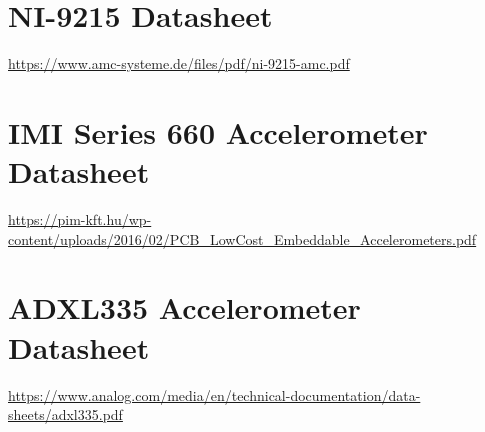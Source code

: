 \documentclass{article}
\begin{document}
\newpage
\begin{appendices}
\pagestyle{fancy}
\renewcommand{\thefigure}{A\arabic{figure}}
\setcounter{figure}{0}


\newpage

\section*{NI-9215 Datasheet}
\url{https://www.amc-systeme.de/files/pdf/ni-9215-amc.pdf}

\section*{IMI Series 660 Accelerometer Datasheet}
\url{https://pim-kft.hu/wp-content/uploads/2016/02/PCB_LowCost_Embeddable_Accelerometers.pdf}

\section*{ADXL335 Accelerometer Datasheet}
\url{https://www.analog.com/media/en/technical-documentation/data-sheets/adxl335.pdf}

\end{appendices}
\end{document}
